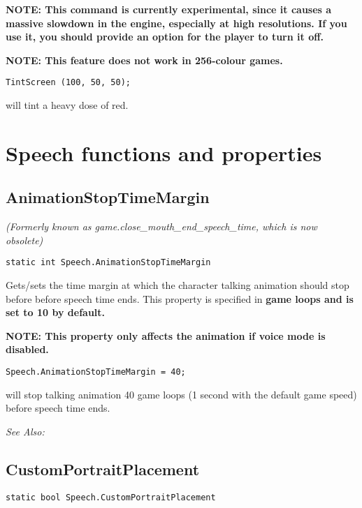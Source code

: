 \bf{NOTE:} This command is currently experimental, since it causes a massive
slowdown in the engine, especially at high resolutions. If you use it, you
should provide an option for the player to turn it off.

\bf{NOTE:} This feature does not work in 256-colour games.

\begin{verbatim}
TintScreen (100, 50, 50);
\end{verbatim}
will tint a heavy dose of red.


\section{Speech functions and properties}\label{SpeechCommands}%

\subsection{AnimationStopTimeMargin}\label{Speech.AnimationStopTimeMargin}%

\it{(Formerly known as game.close_mouth_end_speech_time, which is now obsolete)}

\begin{verbatim}
static int Speech.AnimationStopTimeMargin
\end{verbatim}

Gets/sets the time margin at which the character talking animation should stop before before speech time ends.
This property is specified in \bf{game loops} and is set to 10 by default.

\bf{NOTE:} This property only affects the animation if voice mode is disabled.

\begin{verbatim}
Speech.AnimationStopTimeMargin = 40;
\end{verbatim}
will stop talking animation 40 game loops (1 second with the default game speed) before speech time ends.

\it{See Also:} 


\subsection{CustomPortraitPlacement}\label{Speech.CustomPortraitPlacement}%

\begin{verbatim}
static bool Speech.CustomPortraitPlacement
\end{verbatim}

